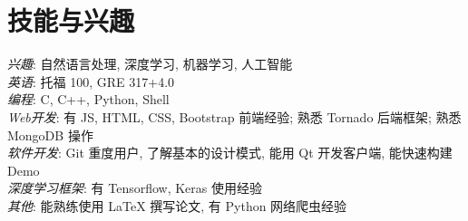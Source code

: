 \section{技能与兴趣}
\textit{兴趣}: 自然语言处理, 深度学习, 机器学习, 人工智能\\
\textit{英语}: 托福 100, GRE 317+4.0\\
\textit{编程}: C, C++, Python, Shell\\
\textit{Web开发}: 有 JS, HTML, CSS, Bootstrap 前端经验; 熟悉 Tornado 后端框架; 熟悉 MongoDB 操作\\
\textit{软件开发}: Git 重度用户, 了解基本的设计模式, 能用 Qt 开发客户端, 能快速构建 Demo\\
\textit{深度学习框架}: 有 Tensorflow, Keras 使用经验\\
\textit{其他}: 能熟练使用 LaTeX 撰写论文, 有 Python 网络爬虫经验

